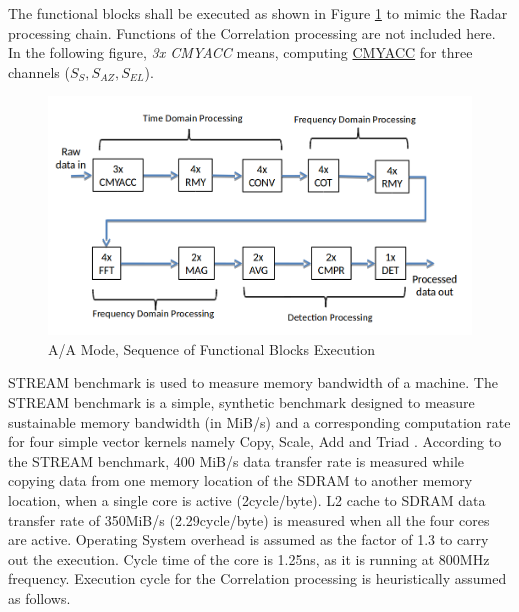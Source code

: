 The functional blocks shall be executed as shown in Figure \ref{fig:bg_related_work:aa_seq} to mimic the Radar processing chain. Functions of the Correlation processing are not included here. In the following figure, \textsl{3x CMYACC} means, computing \hyperlink{benchmarks}{CMYACC} for three channels ($S_{S},S_{AZ},S_{EL}$).

\begin{figure}[h!]
	\centering
	\includegraphics[width=160mm]{figures/aa_seq}
	\caption{A/A Mode, Sequence of Functional Blocks Execution}
	\label{fig:bg_related_work:aa_seq}
\end{figure}

STREAM benchmark\cite{McCalpin2007} is used to measure memory bandwidth of a machine. The STREAM benchmark is a simple, synthetic benchmark designed to measure sustainable memory bandwidth (in MiB/s) and a corresponding computation rate for four simple vector kernels namely Copy, Scale, Add and Triad \cite{streamDef}. According to the STREAM benchmark, 400 MiB/s data transfer rate is measured while copying data from one memory location of the SDRAM to another memory location, when a single core is active (2cycle/byte). L2 cache to SDRAM data transfer rate of 350MiB/s (2.29cycle/byte) is measured when all the four cores are active. Operating System overhead is assumed as the factor of 1.3 to carry out the execution. Cycle time of the core is 1.25ns, as it is running at 800MHz frequency. Execution cycle for the Correlation processing is heuristically assumed as follows.



